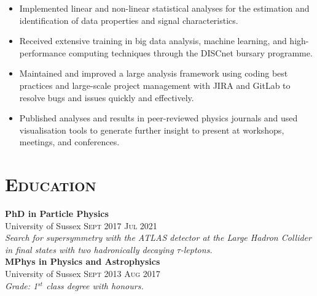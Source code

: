\documentclass[oneside]{article}
\begin{document}
{\begin{minipage}[t][\dimexpr\textheight-2\fboxrule-2\fboxsep\relax][t]{\dimexpr0.6\textwidth-2\fboxrule-2\fboxsep\relax}
{\begin{itemize}
            \item Implemented linear and non-linear statistical analyses for the estimation and identification of data properties and signal characteristics.
            \item Received extensive training in big data analysis, machine learning, and high-performance computing techniques through the DISCnet bursary programme.
            \item Maintained and improved a large analysis framework using coding best practices and large-scale project management with JIRA and GitLab to resolve bugs and issues quickly and effectively.
            \item Published analyses and results in peer-reviewed physics journals and used visualisation tools to generate further insight to present at workshops, meetings, and conferences.
        \end{itemize}
        }
        \section*{\scshape\Large Education \hrulefill}
%
        {\large \textbf{PhD in Particle Physics}} \\ {University of Sussex}\hfill
        {\scshape{}\selectfont\footnotesize Sept 2017 \textendash{} Jul 2021} \\
        {\textit{Search for supersymmetry with the ATLAS detector at the Large Hadron Collider in final states with two hadronically decaying $\tau$-leptons.}} \\
        
        {\large \textbf{MPhys in Physics and Astrophysics}} \\ {University of Sussex} \hfill
        {\scshape{}\selectfont\footnotesize Sept 2013 \textendash{} Aug 2017} \\
        {\textit{Grade: 1$^{st}$ class degree with honours.}} \\


\end{minipage}}
\end{document}
